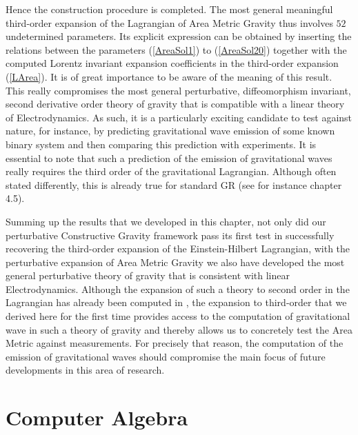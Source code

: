\documentclass[a4paper,12pt, DIV=14, BCOR=5mm, twoside, headsepline, numbers=noenddot]{scrbook}
\begin{document}
Hence the construction procedure is completed. The most general meaningful third-order expansion of the Lagrangian of Area Metric Gravity thus involves $52$ undetermined parameters. Its explicit expression can be obtained by inserting the relations between the parameters (\ref{AreaSol1}) to (\ref{AreaSol20}) together with the computed Lorentz invariant expansion coefficients in the third-order expansion (\ref{LArea}). It is of great importance to be aware of the meaning of this result. This really compromises the most general perturbative, diffeomorphism invariant, second derivative order theory of gravity that is compatible with a linear theory of Electrodynamics. As such, it is a particularly exciting candidate to test against nature, for instance, by predicting gravitational wave emission of some known binary system and then comparing this prediction with experiments. It is essential to note that such a prediction of the emission of gravitational waves really requires the third order of the gravitational Lagrangian. Although often stated differently, this is already true for standard GR (see for instance \cite{1984grra.book.....S} chapter 4.5).

Summing up the results that we developed in this chapter, not only did our perturbative Constructive Gravity framework pass its first test in successfully recovering the third-order expansion of the Einstein-Hilbert Lagrangian, with the perturbative expansion of Area Metric Gravity we also have developed the most general perturbative theory of gravity that is consistent with linear Electrodynamics. Although the expansion of such a theory to second order in the Lagrangian has already been computed in \cite{2017arXiv170803870S}, the expansion to third-order that we derived here for the first time provides access to the computation of gravitational wave in such a theory of gravity and thereby allows us to concretely test the Area Metric against measurements. For precisely that reason, the computation of the emission of gravitational waves should compromise the main focus of future developments in this area of research. 

\chapter{Computer Algebra}\label{computerAlg}
\end{document}
